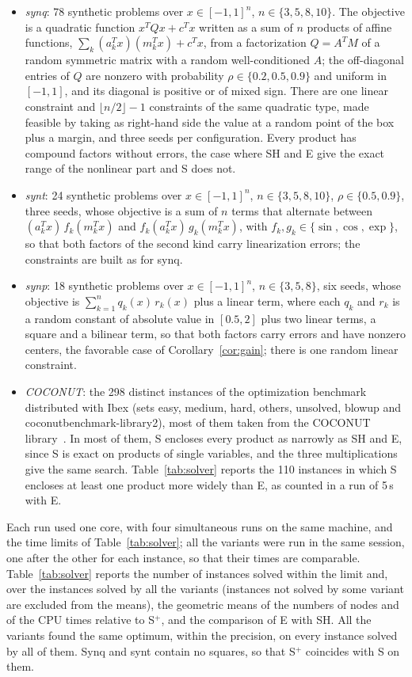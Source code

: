 \documentclass[11pt]{article}
\theoremstyle{definition}
\begin{document}
\begin{itemize}
\item \emph{synq}: 78 synthetic problems over $x\in[-1,1]^n$, $n\in\{3,5,8,10\}$. The objective is a quadratic function $x^TQx+c^Tx$ written as a sum of $n$ products of affine functions, $\sum_k(a_k^Tx)(m_k^Tx)+c^Tx$, from a factorization $Q=A^TM$ of a random symmetric matrix with a random well-conditioned $A$; the off-diagonal entries of $Q$ are nonzero with probability $\rho\in\{0.2,0.5,0.9\}$ and uniform in $[-1,1]$, and its diagonal is positive or of mixed sign. There are one linear constraint and $\lfloor n/2\rfloor-1$ constraints of the same quadratic type, made feasible by taking as right-hand side the value at a random point of the box plus a margin, and three seeds per configuration. Every product has compound factors without errors, the case where SH and E give the exact range of the nonlinear part and S does not.
\item \emph{synt}: 24 synthetic problems over $x\in[-1,1]^n$, $n\in\{3,5,8,10\}$, $\rho\in\{0.5,0.9\}$, three seeds, whose objective is a sum of $n$ terms that alternate between $(a_k^Tx)\,f_k(m_k^Tx)$ and $f_k(a_k^Tx)\,g_k(m_k^Tx)$, with $f_k,g_k\in\{\sin,\cos,\exp\}$, so that both factors of the second kind carry linearization errors; the constraints are built as for synq.
\item \emph{synp}: 18 synthetic problems over $x\in[-1,1]^n$, $n\in\{3,5,8\}$, six seeds, whose objective is $\sum_{k=1}^n q_k(x)\,r_k(x)$ plus a linear term, where each $q_k$ and $r_k$ is a random constant of absolute value in $[0.5,2]$ plus two linear terms, a square and a bilinear term, so that both factors carry errors and have nonzero centers, the favorable case of Corollary~\ref{cor:gain}; there is one random linear constraint.
\item \emph{COCONUT}: the 298 distinct instances of the optimization benchmark distributed with Ibex (sets easy, medium, hard, others, unsolved, blowup and coconutbenchmark-library2), most of them taken from the COCONUT library~\cite{coconut}. In most of them, S encloses every product as narrowly as SH and E, since S is exact on products of single variables, and the three multiplications give the same search. Table~\ref{tab:solver} reports the 110 instances in which S encloses at least one product more widely than E, as counted in a run of 5\,s with E.
\end{itemize}
Each run used one core, with four simultaneous runs on the same machine, and the time limits of Table~\ref{tab:solver}; all the variants were run in the same session, one after the other for each instance, so that their times are comparable. Table~\ref{tab:solver} reports the number of instances solved within the limit and, over the instances solved by all the variants (instances not solved by some variant are excluded from the means), the geometric means of the numbers of nodes and of the CPU times relative to S$^+$, and the comparison of E with SH. All the variants found the same optimum, within the precision, on every instance solved by all of them. Synq and synt contain no squares, so that S$^+$ coincides with S on them.
\end{document}
